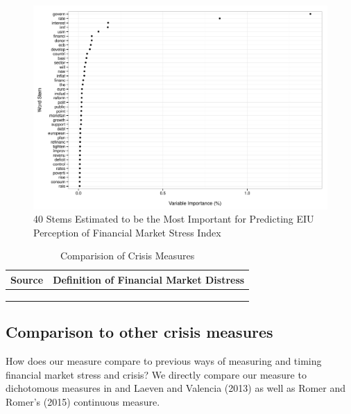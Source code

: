 \documentclass[]{article}
\begin{document}
\begin{figure}
    \caption{40 Stems Estimated to be the Most Important for Predicting EIU Perception of Financial Market Stress Index}
    \label{rf_importance}

    \begin{center}
        \includegraphics[scale=0.5]{analysis/figures/rf_stem_importance.pdf}
    \end{center}

\end{figure}

\begin{table}
    \caption{Comparision of Crisis Measures}
    \label{comp_table}
    \begin{center}
        \begin{tabular}{l | c}
            Source & Definition of Financial Market Distress \\
            \hline
                \cite{Reinhart2009} & \\
                \cite{laeven2013} & \\
                \cite{Romer2015} & \\
            \hline
        \end{tabular}
    \end{center}
\end{table}

\subsection{Comparison to other crisis
measures}\label{comparison-to-other-crisis-measures}

How does our measure compare to previous ways of measuring and timing
financial market stress and crisis? We directly compare our measure to
dichotomous measures in \cite{Reinhart2009} and Laeven and
Valencia (2013) as well as Romer and Romer's (2015) continuous measure.
\end{document}
